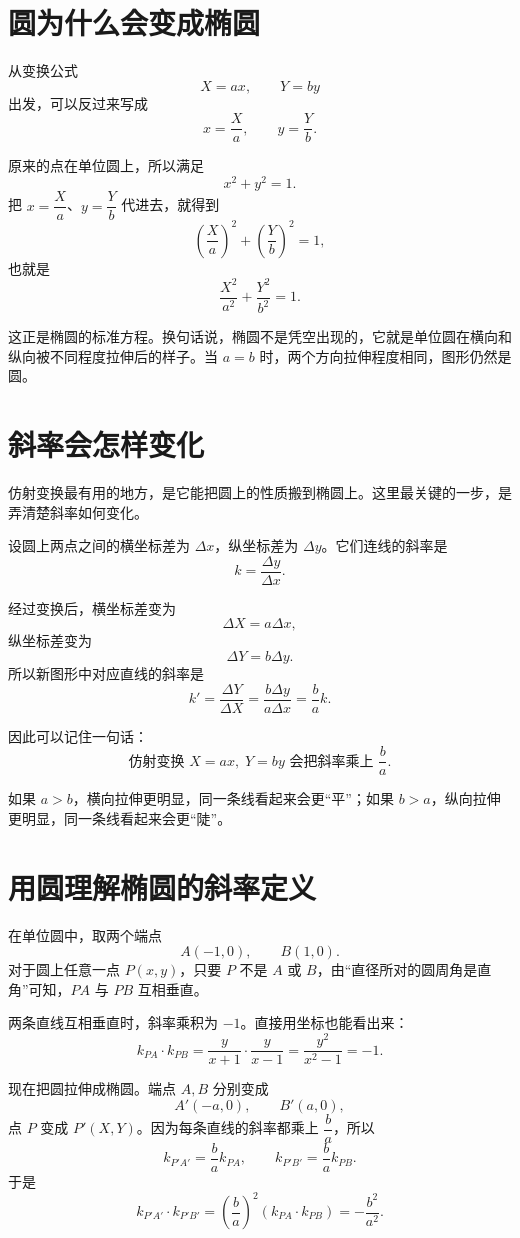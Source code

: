 \documentclass[12pt,a4paper]{ctexart}
\begin{document}
\section*{圆为什么会变成椭圆}

从变换公式
\[
X=ax,\qquad Y=by
\]
出发，可以反过来写成
\[
x=\frac{X}{a},\qquad y=\frac{Y}{b}.
\]

原来的点在单位圆上，所以满足
\[
x^2+y^2=1.
\]
把 $x=\dfrac{X}{a}$、$y=\dfrac{Y}{b}$ 代进去，就得到
\[
\left(\frac{X}{a}\right)^2+\left(\frac{Y}{b}\right)^2=1,
\]
也就是
\[
\frac{X^2}{a^2}+\frac{Y^2}{b^2}=1.
\]

这正是椭圆的标准方程。换句话说，椭圆不是凭空出现的，它就是单位圆在横向和纵向被不同程度拉伸后的样子。当 $a=b$ 时，两个方向拉伸程度相同，图形仍然是圆。

\section*{斜率会怎样变化}

仿射变换最有用的地方，是它能把圆上的性质搬到椭圆上。这里最关键的一步，是弄清楚斜率如何变化。

设圆上两点之间的横坐标差为 $\Delta x$，纵坐标差为 $\Delta y$。它们连线的斜率是
\[
k=\frac{\Delta y}{\Delta x}.
\]

经过变换后，横坐标差变为
\[
\Delta X=a\Delta x,
\]
纵坐标差变为
\[
\Delta Y=b\Delta y.
\]
所以新图形中对应直线的斜率是
\[
k'=\frac{\Delta Y}{\Delta X}
  =\frac{b\Delta y}{a\Delta x}
  =\frac{b}{a}k.
\]

因此可以记住一句话：
\[
\boxed{\text{仿射变换 }X=ax,\;Y=by\text{ 会把斜率乘上 }\frac{b}{a}.}
\]

如果 $a>b$，横向拉伸更明显，同一条线看起来会更“平”；如果 $b>a$，纵向拉伸更明显，同一条线看起来会更“陡”。

\section*{用圆理解椭圆的斜率定义}

在单位圆中，取两个端点
\[
A(-1,0),\qquad B(1,0).
\]
对于圆上任意一点 $P(x,y)$，只要 $P$ 不是 $A$ 或 $B$，由“直径所对的圆周角是直角”可知，$PA$ 与 $PB$ 互相垂直。

两条直线互相垂直时，斜率乘积为 $-1$。直接用坐标也能看出来：
\[
k_{PA}\cdot k_{PB}
=\frac{y}{x+1}\cdot\frac{y}{x-1}
=\frac{y^2}{x^2-1}
=-1.
\]

现在把圆拉伸成椭圆。端点 $A,B$ 分别变成
\[
A'(-a,0),\qquad B'(a,0),
\]
点 $P$ 变成 $P'(X,Y)$。因为每条直线的斜率都乘上 $\dfrac{b}{a}$，所以
\[
k_{P'A'}=\frac{b}{a}k_{PA},\qquad
k_{P'B'}=\frac{b}{a}k_{PB}.
\]
于是
\[
k_{P'A'}\cdot k_{P'B'}
=\left(\frac{b}{a}\right)^2(k_{PA}\cdot k_{PB})
=-\frac{b^2}{a^2}.
\]
\end{document}
